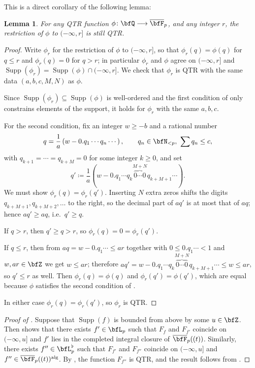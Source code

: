 \documentclass[english,oneside]{smfart}
\newcommand{\opn}[1]{\operatorname{#1}}
\newcommand{\lto}{\longrightarrow}
\newtheorem{lemma}[theorem]{Lemma}
\begin{document}
This is a direct corollary of the following lemma:
\begin{lemma}\label{lem:36014}
    For any QTR function $\phi\colon\bfQ\lto\overline{\bfF}_p$, and any integer $r$, the restriction of $\phi$ to $(-\infty,r]$ is still QTR.
\end{lemma}
\begin{proof}
    Write $\phi_r$ for the restriction of $\phi$ to $(-\infty,r]$, so that $\phi_r(q)=\phi(q)$ for $q\leq r$ and $\phi_r(q)=0$ for $q>r$; in particular $\phi_r$ and $\phi$ agree on $(-\infty,r]$ and $\opn{Supp}(\phi_r)=\opn{Supp}(\phi)\cap(-\infty,r]$. We check that $\phi_r$ is QTR with the same data $(a,b,c,M,N)$ as $\phi$.

    Since $\opn{Supp}(\phi_r)\subseteq\opn{Supp}(\phi)$ is well-ordered and the first condition of  only constrains elements of the support, it holds for $\phi_r$ with the same $a,b,c$.

    For the second condition, fix an integer $w\geq -b$ and a rational number
    $$q=\frac{1}{a}\left(w-0.q_1\cdots q_n\cdots\right),\qquad q_n\in\bfN_{<p},\ \sum q_n\leq c,$$
    with $q_{k+1}=\cdots=q_{k+M}=0$ for some integer $k\geq 0$, and set
    $$q'\coloneqq\frac{1}{a}\left(w-0.q_1\cdots q_k\overbrace{0\cdots0}^{M+N}q_{k+M+1}\cdots\right).$$
    We must show $\phi_r(q)=\phi_r(q')$. Inserting $N$ extra zeros shifts the digits $q_{k+M+1},q_{k+M+2},\dots$ to the right, so the decimal part of $aq'$ is at most that of $aq$; hence $aq'\geq aq$, i.e.\ $q'\geq q$.

    If $q>r$, then $q'\geq q>r$, so $\phi_r(q)=0=\phi_r(q')$.

    If $q\leq r$, then from $aq=w-0.q_1\cdots\leq ar$ together with $0\leq 0.q_1\cdots<1$ and $w,ar\in\bfZ$ we get $w\leq ar$; therefore $aq'=w-0.q_1\cdots q_k\overbrace{0\cdots0}^{M+N}q_{k+M+1}\cdots\leq w\leq ar$, so $q'\leq r$ as well. Then $\phi_r(q)=\phi(q)$ and $\phi_r(q')=\phi(q')$, which are equal because $\phi$ satisfies the second condition of .

    In either case $\phi_r(q)=\phi_r(q')$, so $\phi_r$ is QTR.
\end{proof}

\begin{proof}[Proof of ]
    Suppose that $\opn{Supp}(f)$ is bounded from above by some $u\in \bfZ$. Then  shows that there exists $f'\in\bfL_p$ such that $F_f$ and $F_{f'}$ coincide on $(-\infty,u]$ and $f'$ lies in the completed integral closure of $\overline{\bfF}_p((t))$. Similarly, there exists $f''\in \bfL_p^\flat$ such that $F_{f'}$ and $F_{f''}$ coincide on $(-\infty,u]$ and $f''\in \overline{\bfF}_p((t))^{\opn{alg}}$. By , the function $F_{f''}$ is QTR, and the result follows from .
\end{proof}
\end{document}
